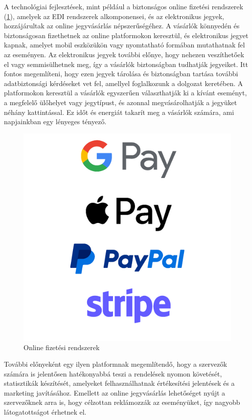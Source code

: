A technológiai fejlesztések, mint például a biztonságos online fizetési rendszerek (\ref{abra:Logok}), amelyek az EDI rendszerek alkomponensei, és az elektronikus jegyek, hozzájárultak az online jegyvásárlás népszerűségéhez. A vásárlók könnyedén és biztonságosan fizethetnek az online platformokon keresztül, és elektronikus jegyet kapnak, amelyet mobil eszközükön vagy nyomtatható formában mutathatnak fel az eseményen. Az elektronikus jegyek további előnye, hogy nehezen veszíthetőek el vagy semmisülhetnek meg, így a vásárlók biztonságban tudhatják jegyeiket. Itt fontos megemlíteni, hogy ezen jegyek tárolása és biztonságban tartása további adatbiztonsági kérdéseket vet fel, amellyel foglalkozunk a dolgozat keretében. A platformokon keresztül a vásárlók egyszerűen választhatják ki a kívánt eseményt, a megfelelő ülőhelyet vagy jegytípust, és azonnal megvásárolhatják a jegyüket néhány kattintással. Ez időt és energiát takarít meg a vásárlók számára, ami napjainkban egy lényeges tényező.

\begin{figure}[!h]
	\centering
	\includegraphics[scale=0.2]{images/logok}
	\caption{Online fizetési rendszerek}
	\label{abra:Logok}
\end{figure}
\pagebreak

További előnyeként egy ilyen platformnak megemlítendő, hogy a szervezők számára is jelentősen hatékonyabbá teszi a rendelések nyomon követését, statisztikák készítését, amelyeket felhasználhatnak értékesítési jelentések és a marketing javításához. Emellett az online jegyvásárlás lehetőséget nyújt a szervezőknek arra is, hogy célzottan reklámozzák az eseményüket, így nagyobb látogatottságot érhetnek el.

